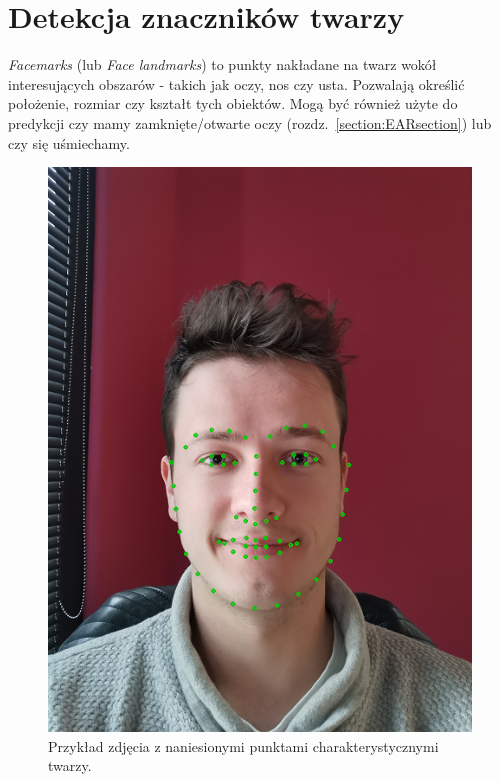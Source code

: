 \newpage

\section{Detekcja znaczników twarzy} \label{section:landmarks}

\textit{Facemarks} (lub \textit{Face landmarks}) to punkty nakładane na twarz wokół interesujących obszarów - takich jak oczy, nos czy usta. Pozwalają określić położenie, rozmiar czy kształt tych obiektów. Mogą być również użyte do predykcji czy mamy zamknięte/otwarte oczy (rozdz.~\hyperref[section:EARsection]{\ref{section:EARsection}}) lub czy się uśmiechamy. 

\begin{figure}[!h]
    \begin{center}
        \includegraphics[scale=0.6]{img/landmark_section/landmarks_1.png}
        \caption{Przykład zdjęcia z naniesionymi punktami charakterystycznymi twarzy.}
        \label{fig:landmarks_1}
    \end{center}
\end{figure}



